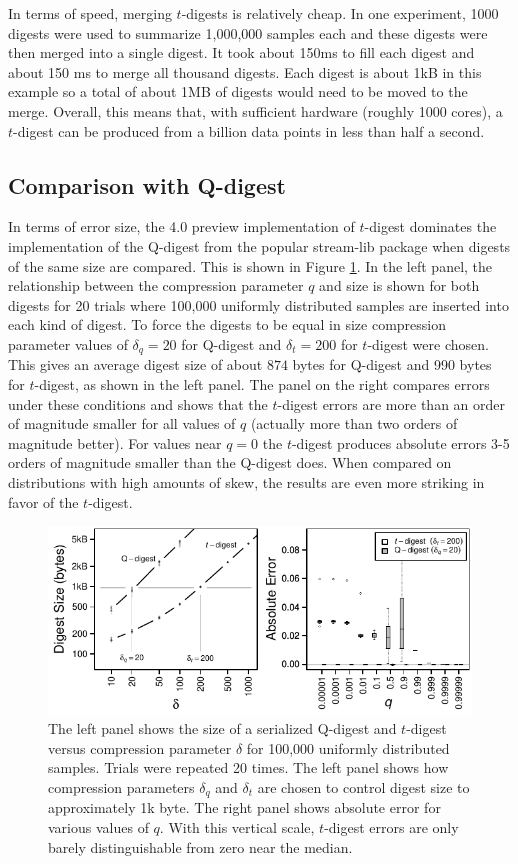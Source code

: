 \documentclass[]{statsoc}
\begin{document}
In terms of speed, merging $t$-digests is relatively cheap. In one experiment, 1000 digests were used to summarize 1,000,000 samples each and these digests were then merged into a single digest. It took about 150ms to fill each digest and about 150 ms to merge all thousand digests. Each digest is about 1kB in this example so a total of about 1MB of digests would need to be moved to the merge. Overall, this means that, with sufficient hardware (roughly 1000 cores), a $t$-digest can be produced from a billion data points in less than half a second. 

\subsection{Comparison with Q-digest}
In terms of error size, the 4.0 preview implementation of $t$-digest dominates the implementation of the Q-digest\cite{qdigest} from the popular stream-lib package \cite{github:stream} when digests of the same size are compared.  This is shown in Figure \ref{fig:qd-comparison}.  In the left panel, the relationship between the compression parameter $q$ and size is shown for both digests for 20 trials where 100,000 uniformly distributed samples are inserted into each kind of digest.  To force the digests to be equal in size compression parameter values of $\delta_q=20$ for Q-digest  and $\delta_t = 200$ for $t$-digest were chosen. This gives an average digest size of about $874$ bytes for Q-digest and 990 bytes for $t$-digest, as shown in the left panel. The panel on the right compares errors under these conditions and shows that the $t$-digest errors are more than an order of magnitude smaller for all values of $q$ (actually more than two orders of magnitude better). For values near $q=0$ the $t$-digest produces absolute errors 3-5 orders of magnitude smaller than the Q-digest does. When compared on distributions with high amounts of skew, the results are even more striking in favor of the $t$-digest.
\begin{figure}[htb] %
   \centering
   \includegraphics[width=4.5in]{qd-sizes.pdf} 
   \caption{The left panel shows the size of a serialized Q-digest and $t$-digest versus compression parameter $\delta$ for 100,000 uniformly distributed samples. Trials were repeated 20 times. The left panel shows how compression parameters $\delta_q$ and $\delta_t$ are chosen to control digest size to approximately 1k byte. The right panel shows absolute error for various values of $q$.  With this vertical scale, $t$-digest errors are only barely distinguishable from zero near the median.  }
   \label{fig:qd-comparison}
\end{figure}
\end{document}

